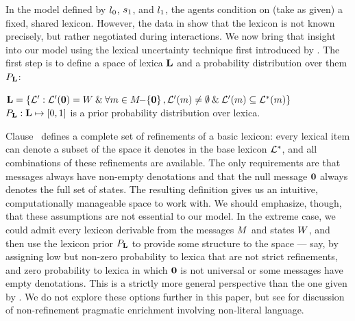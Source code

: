 \documentclass[12pt,twoside]{article}
\renewcommand{\_}{\textbf{\textunderscore\hspace{-4pt}\textunderscore\hspace{-3pt}\textunderscore\hspace{-4pt}\textunderscore}\hspace{0.5pt}}			%
\begin{document}
In the model defined by $l_{0}$, $s_{1}$, and
$l_{1}$, the agents condition on (take as given) a fixed,
shared lexicon. However, the data in  show that the
lexicon is not known precisely, but rather negotiated during
interactions. We now bring that insight into our model using the
lexical uncertainty technique first introduced by
\citet{Bergen:Goodman:Levy:2012,bergen-levy-goodman:2014}. The first
step is to define a space of lexica $\mathbf{L}$ and a probability
distribution over them $P_{\mathbf{L}}$:
%
\begin{exe}
\ex\label{model-extend}
  \begin{xlist} 
  \ex\label{lexset}%
      $\mathbf{L} = 
      \left\{ \mathcal{L}' : 
        \mathcal{L}'(\mathbf{0}) = W \mathbin{\&}
        \forall m \in M{\negthinspace-\negthinspace}\left\{ \mathbf{0} \right\}, 
        \mathcal{L}'(m) \neq \emptyset \mathbin{\&}
        \mathcal{L}'(m) \subseteq \mathcal{L}^{\ast}(m) \right\}$
  \ex\label{LexPrior}%
    $P_{\mathbf{L}} : \mathbf{L} \mapsto [0,1]$ is a prior
    probability distribution over lexica.  
  \end{xlist}
\end{exe}
%
Clause~ defines a complete set of
refinements of a basic lexicon: every lexical item can denote a subset
of the space it denotes in the base lexicon $\mathcal{L}^{\ast}$, and all
combinations of these refinements are available. The only requirements
are that messages always have non-empty denotations and that the null
message $\mathbf{0}$ always denotes the full set of states. The
resulting definition gives us an intuitive, computationally manageable
space to work with. We should emphasize, though, that these
assumptions are not essential to our model. In the extreme case, we
could admit every lexicon derivable from the messages $M$ and
states $W$, and then use the lexicon prior $P_{\mathbf{L}}$ to
provide some structure to the space --- say, by assigning low but
non-zero probability to lexica that are not strict refinements, and
zero probability to lexica in which $\mathbf{0}$ is not universal or
some messages have empty denotations. This is a strictly more general
perspective than the one given by . We do not explore
these options further in this paper, but see
\citealt{Kao:Bergen:Goodman:2014,Kao-etal:2014} for discussion of
non-refinement pragmatic enrichment involving non-literal language.
\end{document}
